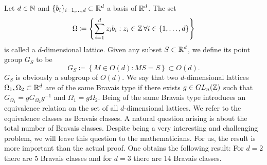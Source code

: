 Let $d\in\mathbb{N}$ and $\{b_i\}_{i=1,\dots,d}\subset \mathbb{R}^d$ a basis of $\mathbb{R}^d$. The set 
\begin{equation*}
    \Omega\coloneq\left\{\sum_{i=1}^{d}z_i b_i: z_i\in\mathbb{Z}\,\forall i\in\{1,\dots,d\}\right\}
\end{equation*}
is called a $d$-dimensional lattice. Given any subset $S\subset\mathbb{R}^d$, we define its point group $G_S$ to be
\begin{equation*}
    G_S\coloneq \left\{M\in O(d) : MS=S\right\}\subset O(d).
\end{equation*}
$G_S$ is obviously a subgroup of $O(d)$. We say that two $d$-dimensional lattices $\Omega_1, \Omega_2\subset \mathbb{R}^d$ are of the same Bravais type if
there exists $g\in GL_n(\mathbb{Z})$ such that $G_{\Omega_1}=g G_{\Omega_2} g^{-1}$ and $\Omega_1=g\Omega_2$. 
Being of the same Bravais type introduces an equivalence relation on the set of all $d$-dimensional lattices.
We refer to the equivalence classes as Bravais classes.
A natural question arising is about the total number of Bravais classes. Despite being a very interesting and challenging problem,
we will leave this question to the mathematicians. For us, the result is more important than the actual proof. One obtains the following result:
For $d=2$ there are 5 Bravais classes and for $d=3$ there are 14 Bravais classes. 
